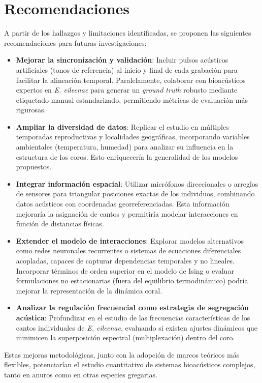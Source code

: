 \chapter*{Recomendaciones}\label{chapter:recomendations}


A partir de los hallazgos y limitaciones identificadas, se 
proponen las siguientes recomendaciones para futuras 
investigaciones:
\begin{itemize}
    \item \textbf{Mejorar la sincronización y validación}: 
    Incluir pulsos acústicos artificiales (tonos de referencia) 
    al inicio y final de cada grabación para facilitar la 
    alineación temporal. Paralelamente, colaborar con 
    bioacústicos expertos en \textit{E. eileenae} para generar 
    un \textit{ground truth} robusto mediante etiquetado manual 
    estandarizado, permitiendo métricas de evaluación más 
    rigurosas.
    
    \item \textbf{Ampliar la diversidad de datos}: Replicar el 
    estudio en múltiples temporadas reproductivas y localidades 
    geográficas, incorporando variables ambientales 
    (temperatura, humedad) para analizar su influencia en la 
    estructura de los coros. Esto enriquecería la generalidad de 
    los modelos propuestos.

    \item \textbf{Integrar información espacial}: Utilizar 
    micrófonos direccionales o arreglos de sensores para 
    triangular posiciones exactas de los individuos, combinando 
    datos acústicos con coordenadas georreferenciadas. Esta 
    información mejoraría la asignación de cantos y permitiría 
    modelar interacciones en función de distancias físicas.

    \item \textbf{Extender el modelo de interacciones}: Explorar modelos 
    alternativos como redes neuronales recurrentes o sistemas de 
    ecuaciones diferenciales acopladas, capaces de capturar 
    dependencias temporales y no lineales. Incorporar términos 
    de orden superior en el modelo de Ising o evaluar 
    formulaciones no estacionarias (fuera del equilibrio termodinámico) 
    podría mejorar la 
    representación de la dinámica coral.

    \item \textbf{Analizar la regulación frecuencial como estrategia de segregación acústica}: 
    Profundizar en el estudio de las frecuencias características 
    de los cantos individuales de \textit{E. eileenae}, 
    evaluando si existen ajustes dinámicos que minimicen la 
    superposición espectral (multiplexación) dentro del coro.
    

\end{itemize}


Estas mejoras metodológicas, junto con la adopción de marcos 
teóricos más flexibles, potenciarían el estudio cuantitativo de 
sistemas bioacústicos complejos, tanto en anuros como en otras 
especies gregarias.